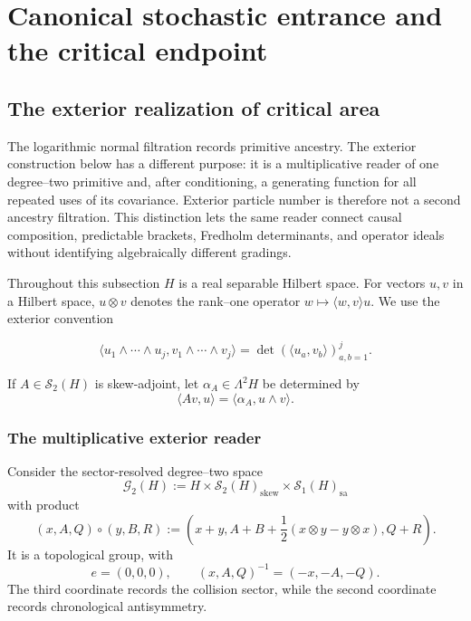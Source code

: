 \documentclass[10pt,reqno]{amsart}
\theoremstyle{plain}
\theoremstyle{definition}
\theoremstyle{remark}
\begin{document}
\section{Canonical stochastic entrance and the critical endpoint}
\label{cc:sec-critical-geometry}

\subsection{The exterior realization of critical area}

The logarithmic normal filtration records primitive ancestry.  The exterior
construction below has a different purpose: it is a multiplicative reader of
one degree--two primitive and, after conditioning, a generating function for
all repeated uses of its covariance.  Exterior particle number is therefore
not a second ancestry filtration.  This distinction lets the same reader
connect causal composition, predictable brackets, Fredholm determinants, and
operator ideals without identifying algebraically different gradings.

Throughout this subsection \(H\) is a real separable Hilbert space.  For vectors
\(u,v\) in a Hilbert space, \(u\otimes v\) denotes the rank--one operator
\(w\mapsto\langle w,v\rangle u\).  We use the exterior convention

\[
 \langle u_1\wedge\cdots\wedge u_j,
         v_1\wedge\cdots\wedge v_j\rangle
 =\det(\langle u_a,v_b\rangle)_{a,b=1}^j.
\]

If \(A\in\mathcal S_2(H)\) is skew-adjoint, let
\(\alpha_A\in\Lambda^2H\) be determined by
\begin{equation}
 \langle Av,u\rangle
 =\langle\alpha_A,u\wedge v\rangle.
 \label{cc:eq-two-form-operator}
\end{equation}

\subsubsection{The multiplicative exterior reader}

Consider the sector-resolved degree--two space
\[
 \mathcal G_2(H)
 :=H\times\mathcal S_2(H)_{\mathrm{skew}}
       \times\mathcal S_1(H)_{\mathrm{sa}}
\]
with product
\begin{equation}
 (x,A,Q)\circ(y,B,R)
 :=\left(x+y,
 A+B+\frac12(x\otimes y-y\otimes x),Q+R\right).
 \label{cc:eq-sector-resolved-product}
\end{equation}
It is a topological group, with
\[
 e=(0,0,0),\qquad (x,A,Q)^{-1}=(-x,-A,-Q).
\]
The third coordinate records the collision sector, while the second
coordinate records chronological antisymmetry.
\end{document}
